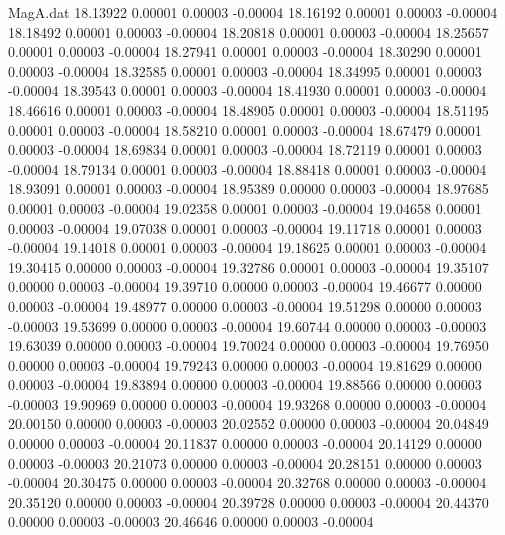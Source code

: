 \begin{filecontents}{MagA.dat}
  18.13922    0.00001    0.00003   -0.00004
  18.16192    0.00001    0.00003   -0.00004
  18.18492    0.00001    0.00003   -0.00004
  18.20818    0.00001    0.00003   -0.00004
  18.25657    0.00001    0.00003   -0.00004
  18.27941    0.00001    0.00003   -0.00004
  18.30290    0.00001    0.00003   -0.00004
  18.32585    0.00001    0.00003   -0.00004
  18.34995    0.00001    0.00003   -0.00004
  18.39543    0.00001    0.00003   -0.00004
  18.41930    0.00001    0.00003   -0.00004
  18.46616    0.00001    0.00003   -0.00004
  18.48905    0.00001    0.00003   -0.00004
  18.51195    0.00001    0.00003   -0.00004
  18.58210    0.00001    0.00003   -0.00004
  18.67479    0.00001    0.00003   -0.00004
  18.69834    0.00001    0.00003   -0.00004
  18.72119    0.00001    0.00003   -0.00004
  18.79134    0.00001    0.00003   -0.00004
  18.88418    0.00001    0.00003   -0.00004
  18.93091    0.00001    0.00003   -0.00004
  18.95389    0.00000    0.00003   -0.00004
  18.97685    0.00001    0.00003   -0.00004
  19.02358    0.00001    0.00003   -0.00004
  19.04658    0.00001    0.00003   -0.00004
  19.07038    0.00001    0.00003   -0.00004
  19.11718    0.00001    0.00003   -0.00004
  19.14018    0.00001    0.00003   -0.00004
  19.18625    0.00001    0.00003   -0.00004
  19.30415    0.00000    0.00003   -0.00004
  19.32786    0.00001    0.00003   -0.00004
  19.35107    0.00000    0.00003   -0.00004
  19.39710    0.00000    0.00003   -0.00004
  19.46677    0.00000    0.00003   -0.00004
  19.48977    0.00000    0.00003   -0.00004
  19.51298    0.00000    0.00003   -0.00003
  19.53699    0.00000    0.00003   -0.00004
  19.60744    0.00000    0.00003   -0.00003
  19.63039    0.00000    0.00003   -0.00004
  19.70024    0.00000    0.00003   -0.00004
  19.76950    0.00000    0.00003   -0.00004
  19.79243    0.00000    0.00003   -0.00004
  19.81629    0.00000    0.00003   -0.00004
  19.83894    0.00000    0.00003   -0.00004
  19.88566    0.00000    0.00003   -0.00003
  19.90969    0.00000    0.00003   -0.00004
  19.93268    0.00000    0.00003   -0.00004
  20.00150    0.00000    0.00003   -0.00003
  20.02552    0.00000    0.00003   -0.00004
  20.04849    0.00000    0.00003   -0.00004
  20.11837    0.00000    0.00003   -0.00004
  20.14129    0.00000    0.00003   -0.00003
  20.21073    0.00000    0.00003   -0.00004
  20.28151    0.00000    0.00003   -0.00004
  20.30475    0.00000    0.00003   -0.00004
  20.32768    0.00000    0.00003   -0.00004
  20.35120    0.00000    0.00003   -0.00004
  20.39728    0.00000    0.00003   -0.00004
  20.44370    0.00000    0.00003   -0.00003
  20.46646    0.00000    0.00003   -0.00004

\end{filecontents}

